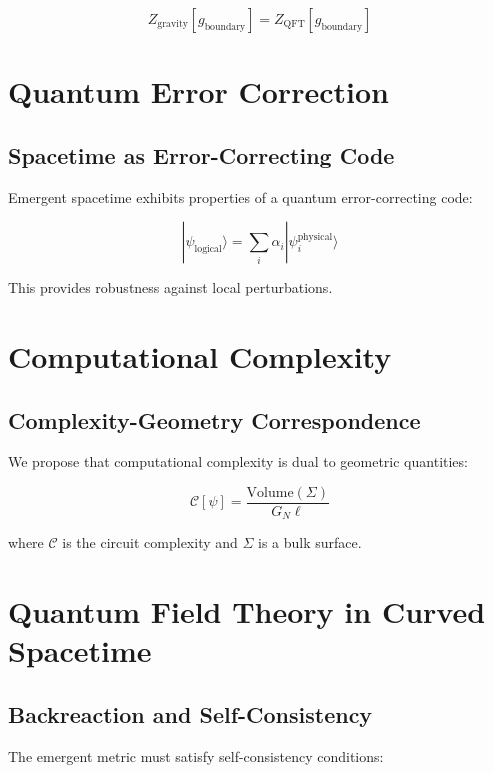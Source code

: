\documentclass[12pt,a4paper]{article}
\begin{document}
\begin{equation}
Z_{\text{gravity}}[g_{\text{boundary}}] = Z_{\text{QFT}}[g_{\text{boundary}}]
\end{equation}

\section{Quantum Error Correction}

\subsection{Spacetime as Error-Correcting Code}

Emergent spacetime exhibits properties of a quantum error-correcting code:

\begin{equation}
|\psi_{\text{logical}}\rangle = \sum_i \alpha_i |\psi_i^{\text{physical}}\rangle
\end{equation}

This provides robustness against local perturbations.

\section{Computational Complexity}

\subsection{Complexity-Geometry Correspondence}

We propose that computational complexity is dual to geometric quantities:

\begin{equation}
\mathcal{C}[\psi] = \frac{\text{Volume}(\Sigma)}{G_N \ell}
\end{equation}

where $\mathcal{C}$ is the circuit complexity and $\Sigma$ is a bulk surface.

\section{Quantum Field Theory in Curved Spacetime}

\subsection{Backreaction and Self-Consistency}

The emergent metric must satisfy self-consistency conditions:
\end{document}
